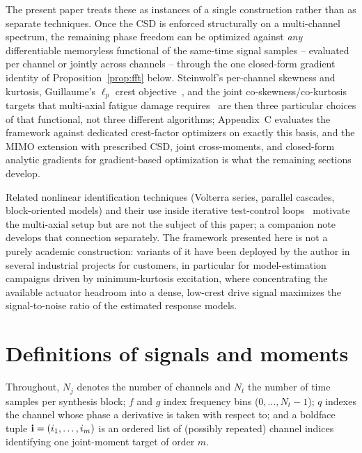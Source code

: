 \documentclass[10pt,a4paper]{article}
\numberwithin{equation}{section}
\DeclarePairedDelimiter\mat{(}{)}
\begin{document}
The present paper treats these as instances of a single construction rather than as separate techniques. Once the CSD is enforced structurally on a multi-channel spectrum, the remaining phase freedom can be optimized against \emph{any} differentiable memoryless functional of the same-time signal samples -- evaluated per channel or jointly across channels -- through the one closed-form gradient identity of Proposition~\ref{prop:fft} below. Steinwolf's per-channel skewness and kurtosis, Guillaume's $\ell_p$ crest objective~\cite{guillaume1991crest}, and the joint co-skewness/co-kurtosis targets that multi-axial fatigue damage requires~\cite{saathoff2006synthetic} are then three particular choices of that functional, not three different algorithms; Appendix~C evaluates the framework against dedicated crest-factor optimizers on exactly this basis, and the MIMO extension with prescribed CSD, joint cross-moments, and closed-form analytic gradients for gradient-based optimization is what the remaining sections develop.

Related nonlinear identification techniques (Volterra series, parallel cascades, block-oriented models) and their use inside iterative test-control loops~\cite{bendat1998nonlinear,pintelon_schoukens_ident,schoukens_odd_multisine} motivate the multi-axial setup but are not the subject of this paper; a companion note develops that connection separately. The framework presented here is not a purely academic construction: variants of it have been deployed by the author in several industrial projects for customers, in particular for model-estimation campaigns driven by minimum-kurtosis excitation, where concentrating the available actuator headroom into a dense, low-crest drive signal maximizes the signal-to-noise ratio of the estimated response models.

\section*{Definitions of signals and moments}

Throughout, $N_j$ denotes the number of channels and $N_t$ the number of time samples per synthesis block; $f$ and $g$ index frequency bins ($0,\ldots,N_t-1$); $q$ indexes the channel whose phase a derivative is taken with respect to; and a boldface tuple $\mathbf{i} = \mat{i_1,\ldots,i_m}$ is an ordered list of (possibly repeated) channel indices identifying one joint-moment target of order $m$.
\end{document}
